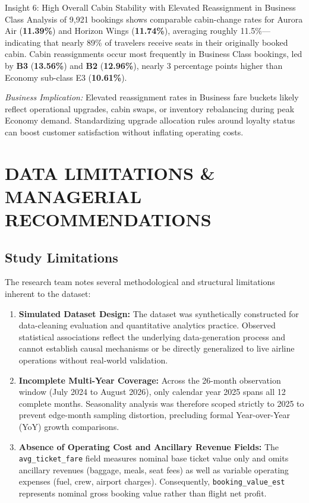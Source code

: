 \documentclass[12pt, a4paper]{report}
\newcommand{\code}[1]{\texttt{\small\color{DarkSlate}#1}}
\newcommand{\pct}[1]{\textbf{#1\%}}
\begin{document}
\begin{insightbox}{Insight 6: High Overall Cabin Stability with Elevated Reassignment in Business Class}
Analysis of 9,921 bookings shows comparable cabin-change rates for Aurora Air (\pct{11.39}) and Horizon Wings (\pct{11.74}), averaging roughly 11.5\%---indicating that nearly 89\% of travelers receive seats in their originally booked cabin. Cabin reassignments occur most frequently in Business Class bookings, led by \textbf{B3} (\pct{13.56}) and \textbf{B2} (\pct{12.96}), nearly 3 percentage points higher than Economy sub-class E3 (\pct{10.61}).

\textit{Business Implication:} Elevated reassignment rates in Business fare buckets likely reflect operational upgrades, cabin swaps, or inventory rebalancing during peak Economy demand. Standardizing upgrade allocation rules around loyalty status can boost customer satisfaction without inflating operating costs.
\end{insightbox}

\chapter{DATA LIMITATIONS \& MANAGERIAL RECOMMENDATIONS}

\section{Study Limitations}

The research team notes several methodological and structural limitations inherent to the dataset:
\begin{enumerate}
  \item \textbf{Simulated Dataset Design:} The dataset was synthetically constructed for data-cleaning evaluation and quantitative analytics practice. Observed statistical associations reflect the underlying data-generation process and cannot establish causal mechanisms or be directly generalized to live airline operations without real-world validation.
  \item \textbf{Incomplete Multi-Year Coverage:} Across the 26-month observation window (July 2024 to August 2026), only calendar year 2025 spans all 12 complete months. Seasonality analysis was therefore scoped strictly to 2025 to prevent edge-month sampling distortion, precluding formal Year-over-Year (YoY) growth comparisons.
  \item \textbf{Absence of Operating Cost and Ancillary Revenue Fields:} The \code{avg\_ticket\_fare} field measures nominal base ticket value only and omits ancillary revenues (baggage, meals, seat fees) as well as variable operating expenses (fuel, crew, airport charges). Consequently, \code{booking\_value\_est} represents nominal gross booking value rather than flight net profit.
\end{enumerate}
\end{document}
